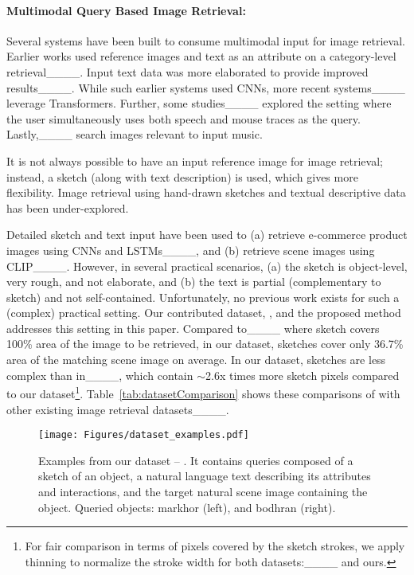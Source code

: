 \paragraph{Multimodal Query Based Image Retrieval:}
Several systems have been built to consume multimodal input for image retrieval. 
Earlier works used reference images and text as an attribute on a category-level retrieval____. Input text data was more elaborated to provide improved results____. While such earlier systems used CNNs, more recent systems____ leverage Transformers. Further, some studies____ explored the setting where the user simultaneously uses both speech and mouse traces as the query. Lastly,____ search images relevant to input music.

It is not always possible to have an input reference image for image retrieval; instead, a sketch (along with text description) is used, which gives more flexibility. Image retrieval using hand-drawn sketches and textual descriptive data has been under-explored.

Detailed sketch and text input have been used to (a) retrieve e-commerce product images using CNNs and LSTMs____, and (b) retrieve scene images using CLIP____. However, in several practical scenarios, 
(a) the sketch is object-level, very rough, and not elaborate, and (b) the text is partial (complementary to sketch) and not self-contained. Unfortunately, no previous work exists for such a (complex) practical setting. Our contributed dataset, \data{}, and the proposed method addresses this setting in this paper. Compared to____ where sketch covers 100\% area of the image to be retrieved, in our dataset, sketches cover only 36.7\% area of the matching scene image on average.
In our dataset, sketches are less complex than in____, which contain $\sim$2.6x times more sketch pixels compared to our dataset\footnote{For fair comparison in terms of pixels covered by the sketch strokes, we apply thinning to normalize the stroke width for both datasets:____ and ours.}. Table~\ref{tab:datasetComparison} shows these comparisons of \data{} with other existing image retrieval datasets____.

\begin{figure}[!t]
    \centering
     \texttt{[image: Figures/dataset\_examples.pdf]}
          \caption{Examples from our dataset -- \data{}. It contains queries composed of a sketch of an object, a natural language text describing its attributes and interactions, and the target natural scene image containing the object. Queried objects: markhor (left), and bodhran (right).}
    \label{fig:datasetExamples}
\end{figure}